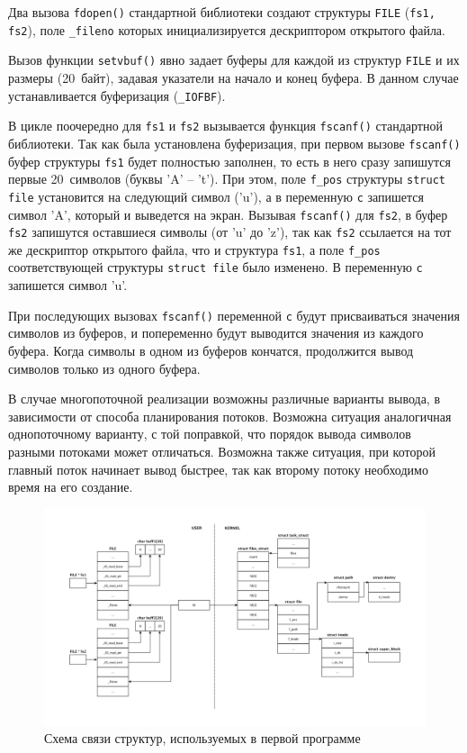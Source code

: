 Два вызова \texttt{fdopen()} стандартной библиотеки создают структуры
\texttt{FILE} (\texttt{fs1, fs2}), поле \texttt{\_fileno} которых
инициализируется дескриптором открытого файла.

Вызов функции \texttt{setvbuf()} явно задает буферы для каждой из
структур \texttt{FILE} и их размеры (20~байт), задавая указатели на начало и конец буфера. В данном случае устанавливается буферизация (\texttt{\_IOFBF}).

В цикле поочередно для \texttt{fs1} и \texttt{fs2} вызывается функция
\texttt{fscanf()} стандартной библиотеки. Так как была установлена
буферизация, при первом вызове \texttt{fscanf()} буфер структуры \texttt{fs1}
будет полностью заполнен, то есть в него сразу запишутся первые 20~символов (буквы 'A' -- 't'). При этом, поле \texttt{f\_pos} структуры \texttt{struct file}
установится на следующий символ ('u'), а в переменную \texttt{c} запишется
символ 'A', который и выведется на экран. Вызывая \texttt{fscanf()} для
\texttt{fs2}, в буфер \texttt{fs2} запишутся оставшиеся символы (от 'u' до 'z'), так как
\texttt{fs2} ссылается на тот же дескриптор открытого файла, что и структура \texttt{fs1}, а
поле \texttt{f\_pos} соответствующей структуры \texttt{struct file} было
изменено. В переменную \texttt{c} запишется символ 'u'.

При последующих вызовах \texttt{fscanf()} переменной \texttt{c} будут
присваиваться значения символов из буферов, и попеременно будут выводится
значения из каждого буфера. Когда символы в одном из буферов кончатся,
продолжится вывод символов только из одного буфера.

В случае многопоточной реализации возможны различные варианты вывода, в
зависимости от способа планирования потоков. Возможна
ситуация аналогичная однопоточному варианту, с той поправкой, что порядок вывода
символов разными потоками может отличаться. Возможна также ситуация, при которой главный поток начинает вывод быстрее, так как второму потоку необходимо время на его создание.

\begin{figure}[ht]
	\centering
	\includegraphics[width=\textwidth]{img/11}
	\caption{Схема связи структур, используемых в первой программе}
\end{figure}\newpage

